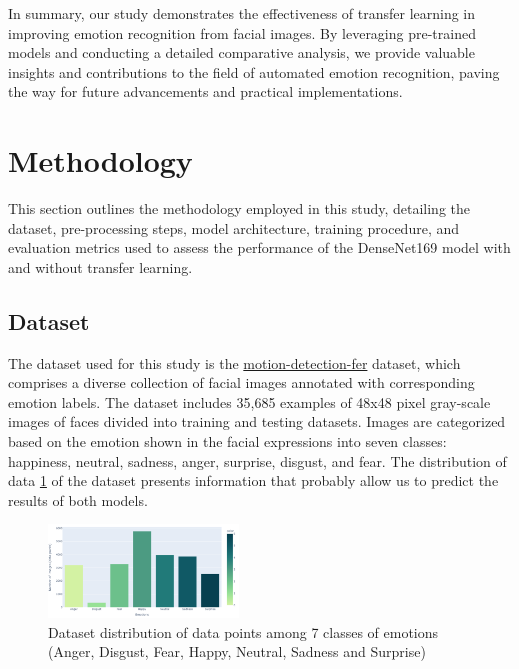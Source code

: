 \documentclass[conference]{IEEEtran}
\begin{document}
In summary, our study demonstrates the effectiveness of transfer learning in improving emotion recognition from facial images. By leveraging pre-trained models and conducting a detailed comparative analysis, we provide valuable insights and contributions to the field of automated emotion recognition, paving the way for future advancements and practical implementations.



\section{Methodology}
This section outlines the methodology employed in this study, detailing the dataset, pre-processing steps, model architecture, training procedure, and evaluation metrics used to assess the performance of the DenseNet169 model with and without transfer learning.

\subsection{Dataset}
The dataset used for this study is the \href{https://www.kaggle.com/datasets/ananthu017/emotion-detection-fer}{motion-detection-fer} dataset, which comprises a diverse collection of facial images annotated with corresponding emotion labels. The dataset includes 35,685 examples of 48x48 pixel gray-scale images of faces divided into training and testing datasets. Images are categorized based on the emotion shown in the facial expressions into seven classes: happiness, neutral, sadness, anger, surprise, disgust, and fear. The distribution of data \ref{fig:datasetdistr} of the dataset presents information that probably allow us to predict the results of both models.
\begin{figure}[H]
    \centering
    \includegraphics[width=0.45\textwidth]{Figures/Dataset distribution.png}
    \caption{Dataset distribution of data points among 7 classes of emotions (Anger, Disgust, Fear, Happy, Neutral, Sadness and Surprise)}
    \label{fig:datasetdistr}
\end{figure}

\end{document}
